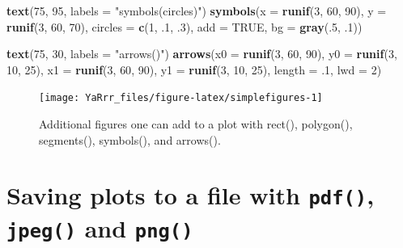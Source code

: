 \documentclass[]{book}
\newenvironment{Shaded}{\begin{snugshade}}{\end{snugshade}}
\newcommand{\KeywordTok}[1]{\textcolor[rgb]{0.13,0.29,0.53}{\textbf{#1}}}
\newcommand{\DataTypeTok}[1]{\textcolor[rgb]{0.13,0.29,0.53}{#1}}
\newcommand{\DecValTok}[1]{\textcolor[rgb]{0.00,0.00,0.81}{#1}}
\newcommand{\StringTok}[1]{\textcolor[rgb]{0.31,0.60,0.02}{#1}}
\newcommand{\OtherTok}[1]{\textcolor[rgb]{0.56,0.35,0.01}{#1}}
\newcommand{\NormalTok}[1]{#1}
\theoremstyle{definition}
\theoremstyle{definition}
\theoremstyle{remark}
\begin{document}
\begin{Shaded}
\begin{Highlighting}[]
\KeywordTok{text}\NormalTok{(}\DecValTok{75}\NormalTok{, }\DecValTok{95}\NormalTok{, }\DataTypeTok{labels =} \StringTok{"symbols(circles)"}\NormalTok{)}
\KeywordTok{symbols}\NormalTok{(}\DataTypeTok{x =} \KeywordTok{runif}\NormalTok{(}\DecValTok{3}\NormalTok{, }\DecValTok{60}\NormalTok{, }\DecValTok{90}\NormalTok{),}
        \DataTypeTok{y =} \KeywordTok{runif}\NormalTok{(}\DecValTok{3}\NormalTok{, }\DecValTok{60}\NormalTok{, }\DecValTok{70}\NormalTok{),}
        \DataTypeTok{circles =} \KeywordTok{c}\NormalTok{(}\DecValTok{1}\NormalTok{, .}\DecValTok{1}\NormalTok{, .}\DecValTok{3}\NormalTok{),}
        \DataTypeTok{add =} \OtherTok{TRUE}\NormalTok{, }\DataTypeTok{bg =} \KeywordTok{gray}\NormalTok{(.}\DecValTok{5}\NormalTok{, .}\DecValTok{1}\NormalTok{))}

\KeywordTok{text}\NormalTok{(}\DecValTok{75}\NormalTok{, }\DecValTok{30}\NormalTok{, }\DataTypeTok{labels =} \StringTok{"arrows()"}\NormalTok{)}
\KeywordTok{arrows}\NormalTok{(}\DataTypeTok{x0 =} \KeywordTok{runif}\NormalTok{(}\DecValTok{3}\NormalTok{, }\DecValTok{60}\NormalTok{, }\DecValTok{90}\NormalTok{),}
       \DataTypeTok{y0 =} \KeywordTok{runif}\NormalTok{(}\DecValTok{3}\NormalTok{, }\DecValTok{10}\NormalTok{, }\DecValTok{25}\NormalTok{),}
       \DataTypeTok{x1 =} \KeywordTok{runif}\NormalTok{(}\DecValTok{3}\NormalTok{, }\DecValTok{60}\NormalTok{, }\DecValTok{90}\NormalTok{),}
       \DataTypeTok{y1 =} \KeywordTok{runif}\NormalTok{(}\DecValTok{3}\NormalTok{, }\DecValTok{10}\NormalTok{, }\DecValTok{25}\NormalTok{),}
       \DataTypeTok{length =}\NormalTok{ .}\DecValTok{1}\NormalTok{, }\DataTypeTok{lwd =} \DecValTok{2}\NormalTok{)}
\end{Highlighting}
\end{Shaded}

\begin{figure}

{\centering \texttt{[image: YaRrr\_files/figure-latex/simplefigures-1]} 

}

\caption{Additional figures one can add to a plot with rect(), polygon(), segments(), symbols(), and arrows().}\label{fig:simplefigures}
\end{figure}

\section{\texorpdfstring{Saving plots to a file with \texttt{pdf()},
\texttt{jpeg()} and
\texttt{png()}}{Saving plots to a file with pdf(), jpeg() and png()}}\label{saving-plots-to-a-file-with-pdf-jpeg-and-png}
\end{document}
